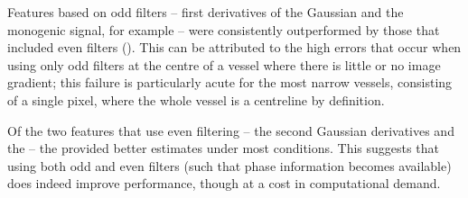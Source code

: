 \label{s:exp_retinogram_orientation_wrt_feature}

Features based on odd filters -- first derivatives of the Gaussian and the monogenic signal, for example -- were consistently outperformed by those that included even filters (). This can be attributed to the high errors that occur when using only odd filters at the centre of a vessel where there is little or no image gradient; this failure is particularly acute for the most narrow vessels, consisting of a single pixel, where the whole vessel is a centreline by definition. 

Of the two features that use even filtering -- the second Gaussian derivatives and the \dtcwt{} -- the \dtcwt{} provided better estimates under most conditions. This suggests that using both odd and even filters (such that phase information becomes available) does indeed improve performance, though at a cost in computational demand.



